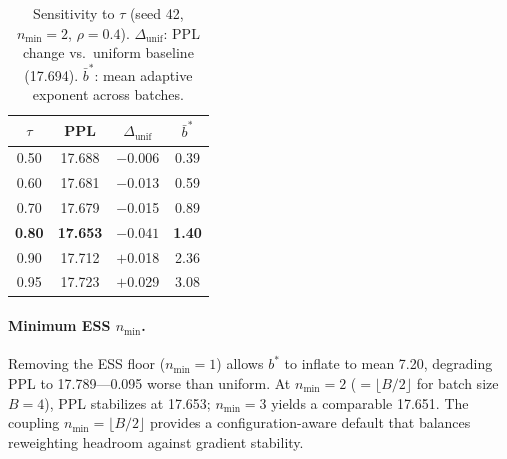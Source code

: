 \begin{table}[t]
\centering
\small
\begin{tabular}{@{}cccc@{}}
\toprule
$\tau$ & \textbf{PPL} & $\Delta_{\mathrm{unif}}$ & $\bar{b}^*$ \\
\midrule
0.50 & 17.688 & $-$0.006 & 0.39 \\
0.60 & 17.681 & $-$0.013 & 0.59 \\
0.70 & 17.679 & $-$0.015 & 0.89 \\
\textbf{0.80} & \textbf{17.653} & $\mathbf{-0.041}$ & \textbf{1.40} \\
0.90 & 17.712 & $+$0.018 & 2.36 \\
0.95 & 17.723 & $+$0.029 & 3.08 \\
\bottomrule
\end{tabular}
\caption{Sensitivity to $\tau$ (seed 42, $n_{\min}{=}2$, $\rho{=}0.4$).
$\Delta_{\mathrm{unif}}$: PPL change vs.\ uniform baseline (17.694).
$\bar{b}^*$: mean adaptive exponent across batches.}
\label{tab:tau}
\end{table}

\paragraph{Minimum ESS $n_{\min}$.}
Removing the ESS floor ($n_{\min} = 1$) allows $b^*$ to inflate to mean 7.20, degrading PPL to 17.789---0.095 worse than uniform.
At $n_{\min} = 2$ ($= \lfloor B/2 \rfloor$ for batch size $B{=}4$), PPL stabilizes at 17.653; $n_{\min} = 3$ yields a comparable 17.651.
The coupling $n_{\min} = \lfloor B/2 \rfloor$ provides a configuration-aware default that balances reweighting headroom against gradient stability.
